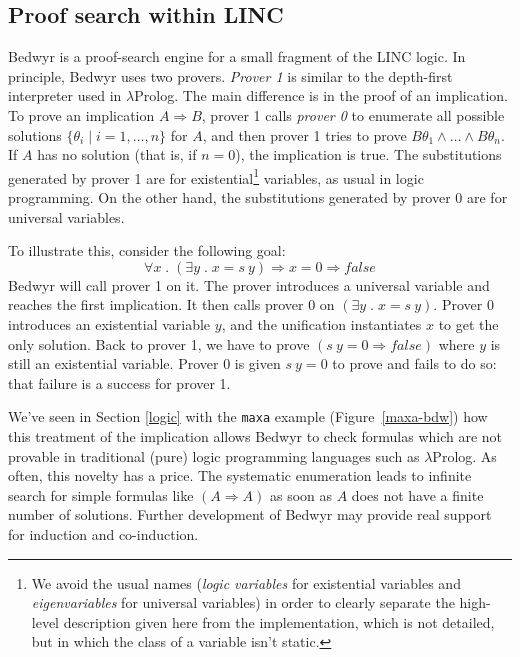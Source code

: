\documentclass{article}
\newcommand{\lp}{$\lambda$Prolog}
\newcommand{\qs}{\; . \;}
\begin{document}
\subsection{Proof search within LINC}
\label{psearch}

Bedwyr is a proof-search engine for a small fragment of the LINC
logic.  In principle, Bedwyr uses two provers.  {\em Prover 1} is similar to
the depth-first interpreter used in \lp{}.  The main
difference is in the proof of an implication.
To prove an implication $A\Rightarrow B$, prover 1  calls {\em prover 0}
to enumerate all possible solutions
$\{\theta_i\;|\;i=1,\ldots,n\}$ for $A$,
and then prover 1 tries to prove $B\theta_1\wedge\dots\wedge B\theta_n$.
If $A$ has no solution (that is, if $n=0$), the implication is true.
The substitutions generated by prover 1 are for existential\footnote{
We avoid the usual names (\emph{logic variables} for existential variables and
\emph{eigenvariables} for universal variables) in order to clearly separate the
high-level description given here from the implementation, which is not
detailed, but in which the class of a variable isn't static.}
variables, as usual in logic programming.
On the other hand, the substitutions generated by prover 0 are for
universal variables.

To illustrate this,
consider the following goal:
\[ \forall x \qs (\exists y \qs x=s~y) \Rightarrow x=0 \Rightarrow false \]
Bedwyr will call prover 1 on it. The prover introduces a universal variable
and reaches the first implication.
It then calls prover 0 on $(\exists y \qs x = s~y)$.
Prover 0 introduces an existential variable $y$,
and the unification instantiates $x$ to get the only solution.
Back to prover 1, we have to prove $(s~y = 0 \Rightarrow false)$
where $y$ is still an existential variable. Prover 0 is given $s~y=0$
to prove and fails to do so: that failure is a success for prover 1.

We've seen in Section \ref{logic} with the \verb.maxa. example
(Figure~\ref{maxa-bdw}) how this treatment of the implication allows
Bedwyr to check formulas which are not provable in traditional (pure) logic
programming languages such as \lp{}.
As often, this novelty has a price. The systematic enumeration leads to
infinite search for simple formulas like $(A \Rightarrow A)$ as soon as
$A$ does not have a finite number of solutions.
Further development of Bedwyr may provide
real support for induction and co-induction.
\end{document}

